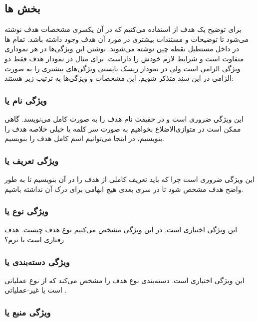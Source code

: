 \subsection{بخش ها}

برای توضیح یک هدف از  استفاده می‌کنیم که در آن یکسری مشخصات هدف
نوشته می‌شود تا توضیحات و مستندات بیشتری در مورد آن هدف وجود داشته باشد. تمام
ها در داخل مستطیل نقطه چین نوشته می‌شوند. نوشتن این ویژگی‌ها در
هر نموداری متفاوت است و شرایط لازم خودش را داراست. برای مثال در نمودار هدف فقط
دو ویژگی الزامی است ولی در نمودار ریسک بایستی ویژگی‌های بیشتری را به صورت الزامی
در این سند متذکر شویم. این مشخصات و ویژگی‌ها به ترتیب زیر هستند:

\subsubsection{ویژگی نام یا }

این ویژگی ضروری است و در حقیقت نام هدف را به صورت کامل می‌نویسد. گاهی ممکن است
در متوازی‌الاضلاع بخواهیم به صورت سر کلمه یا خیلی خلاصه هدف را بنویسیم، در اینجا
می‌توانیم اسم کامل هدف را بنویسیم.

\subsubsection{ویژگی تعریف یا }

این ویژگی ضروری است چرا که باید تعریف کاملی از هدف را در آن بنویسیم تا به طور
واضح هدف مشخص شود تا در سری بعدی هیچ ابهامی برای درک آن نداشته باشیم.

\subsubsection{ویژگی نوع یا }

این ویژگی اختیاری است. در این ویژگی مشخص می‌کنیم نوع هدف چیست. هدف رفتاری است یا
نرم؟

\subsubsection{ویژگی دسته‌بندی یا }

این ویژگی اختیاری است. دسته‌بندی نوع هدف را مشخص می‌کند که از نوع عملیاتی
 است یا غیر-عملیاتی .

\subsubsection{ویژگی منبع یا }

